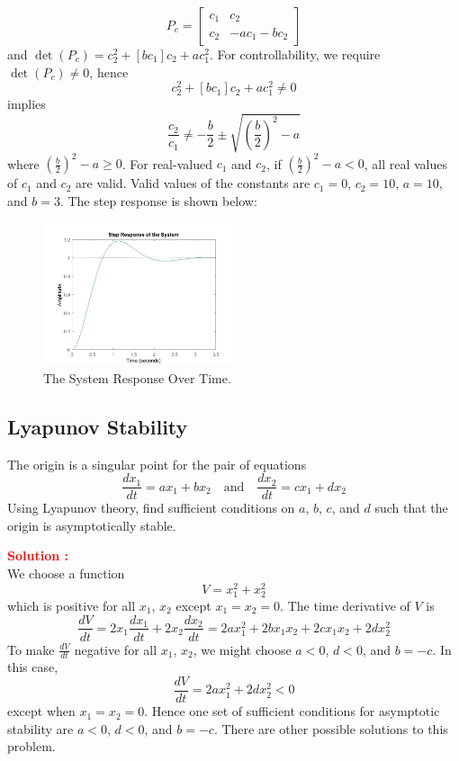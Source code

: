 \documentclass[12pt]{article}
\begin{document}
\[
P_c = \begin{bmatrix} c_1 & c_2 \\ c_2 & -ac_1 - bc_2 \end{bmatrix}
\] 
and \(\det(P_c) = c_2^2 + [bc_1]c_2 + ac_1^2\). For controllability, we require \(\det(P_c) \neq 0\), hence 
\[
c_2^2 + [bc_1]c_2 + ac_1^2 \neq 0
\] 
implies 
\[
\frac{c_2}{c_1} \neq -\frac{b}{2} \pm \sqrt{\left(\frac{b}{2}\right)^2 - a}
\] 
where \(\left(\frac{b}{2}\right)^2 - a \geq 0\). For real-valued \(c_1\) and \(c_2\), if \(\left(\frac{b}{2}\right)^2 - a < 0\), all real values of \(c_1\) and \(c_2\) are valid. Valid values of the constants are \(c_1 = 0\), \(c_2 = 10\), \(a = 10\), and \(b = 3\). The step response is shown below:
\begin{figure}[h]
    \centering
    \includegraphics[width=0.5\textwidth]{figs/10.2.jpg}
    \caption{The System Response Over Time.}
    \label{fig:yb}
\end{figure}
\clearpage

\subsection{Lyapunov Stability}

The origin is a singular point for the pair of equations
\[
\frac{dx_1}{dt} = ax_1 + bx_2 \quad \text{and} \quad \frac{dx_2}{dt} = cx_1 + dx_2
\]
Using Lyapunov theory, find sufficient conditions on \(a\), \(b\), \(c\), and \(d\) such that the origin is asymptotically stable.

\textbf{\textcolor{red}{Solution :}} \\
We choose a function
\[ V = x_1^2 + x_2^2 \]
which is positive for all \(x_1\), \(x_2\) except \(x_1 = x_2 = 0\). The time derivative of \(V\) is
\[
\frac{dV}{dt} = 2x_1 \frac{dx_1}{dt} + 2x_2 \frac{dx_2}{dt} = 2ax_1^2 + 2bx_1x_2 + 2cx_1x_2 + 2dx_2^2
\]
To make \(\frac{dV}{dt}\) negative for all \(x_1\), \(x_2\), we might choose \(a < 0\), \(d < 0\), and \(b = -c\). In this case,
\[
\frac{dV}{dt} = 2ax_1^2 + 2dx_2^2 < 0
\]
except when \(x_1 = x_2 = 0\). Hence one set of sufficient conditions for asymptotic stability are \(a < 0\), \(d < 0\), and \(b = -c\). There are other possible solutions to this problem.
\clearpage
\end{document}
